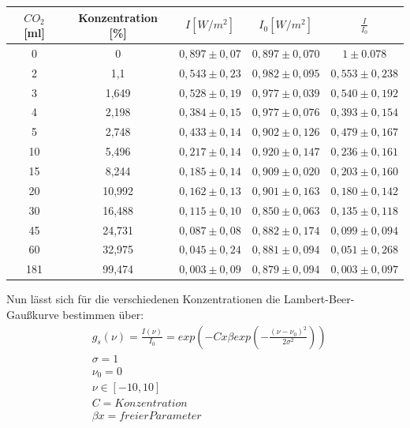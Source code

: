 \documentclass{article}
\begin{document}
            \begin{center}
                \begin{tabular}{|c|c|c|c|c|}
                    \hline
                    $CO_2$ [ml] & Konzentration [\%] & $I [W/m^2]$ & $I_0 [W/m^2]$ & $\frac{I}{I_0}$ \\
                    \hline
                    0      & 0     & $0,897\pm 0,07$& $0,897\pm 0,070$& $1\pm 0.078$\\
                    2      & 1,1   & $0,543\pm 0,23$& $0,982\pm 0,095$& $0,553\pm 0,238$\\
                    3      & 1,649 & $0,528\pm 0,19$& $0,977\pm 0,039$& $0,540\pm 0,192$\\
                    4      & 2,198 & $0,384\pm 0,15$& $0,977\pm 0,076$& $0,393\pm 0,154$\\
                    5      & 2,748 & $0,433\pm 0,14$& $0,902\pm 0,126$& $0,479\pm 0,167$\\
                    10     & 5,496 & $0,217\pm 0,14$& $0,920\pm 0,147$& $0,236\pm 0,161$\\
                    15     & 8,244 & $0,185\pm 0,14$& $0,909\pm 0,020$& $0,203\pm 0,160$\\
                    20     & 10,992 & $0,162\pm 0,13$& $0,901\pm 0,163$& $0,180\pm 0,142$\\
                    30     & 16,488 & $0,115\pm 0,10$& $0,850\pm 0,063$& $0,135\pm 0,118$\\
                    45     & 24,731 & $0,087\pm 0,08$& $0,882\pm 0,174$& $0,099\pm 0,094$\\
                    60     & 32,975 & $0,045\pm 0,24$& $0,881\pm 0,094$& $0,051\pm 0,268$\\
                    181    & 99,474 & $0,003\pm 0,09$& $0,879\pm 0,094$& $0,003\pm 0,097$\\
                    \hline 
                \end{tabular}
            \end{center}
            Nun lässt sich für die verschiedenen Konzentrationen die Lambert-Beer-Gaußkurve
            bestimmen über:
            \begin{equation}
                \begin{aligned}
                    &g_s(\nu) = \frac{I(\nu)}{I_0} = exp(-Cx\beta exp(-\frac{(\nu-\nu_0)^2}{2\sigma^2}))\\
                    &\sigma = 1\\
                    &\nu_0 = 0\\
                    &\nu \in [-10,10]\\
                    &C = Konzentration \\
                    &\beta x = freier Parameter
                \end{aligned}
            \end{equation}
\end{document}
